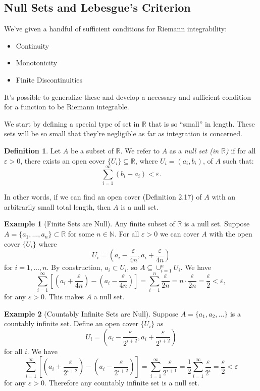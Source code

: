 \documentclass{article}
\newcommand{\N}{\mathbb{N}}
\newcommand{\R}{\mathbb{R}}
\theoremstyle{definition}
\newtheorem{definition}{Definition}[section]
\newtheorem{example}{Example}[section]
\begin{document}
\subsection{Null Sets and Lebesgue's Criterion}
We've given a handful of sufficient conditions for Riemann integrability:
\begin{itemize}
	\item Continuity
	\item Monotonicity 
	\item Finite Discontinuities 
\end{itemize}
It's possible to generalize these and develop a necessary and sufficient condition for a function to be Riemann integrable. 

We start by defining a special type of set in $ \R $ that is so ``small'' in length. These sets will be so small that they're negligible as far as integration is concerned. 
\begin{definition}
	Let $ A $ be a subset of $ \R $. We refer to $ A $ as a \textit{\color{red}null set (in $ \R $)} if for all $ \varepsilon > 0 $, there exists an open cover $ \{U_i\}\subseteq \R $, where $ U_i=(a_i,b_i) $, of $ A $ such that:
	$$\sum_{i=1}^\infty (b_i-a_i) < \varepsilon .$$
\end{definition}
In other words, if we can find an open cover (Definition 2.17) of $ A $ with an arbitrarily small total length, then $ A $ is a null set. 
\begin{example}[Finite Sets are Null]
Any finite subset of $ \R $ is a null set. Suppose $ A = \{a_1,\ldots,a_n\} \subset \R $ for some $ n\in \N $. For all $ \varepsilon>0 $ we can cover $ A $ with the open cover $ \{U_i\} $ where $$ U_i = \left(a_i-\frac{\varepsilon}{4n}, a_i+\frac{\varepsilon}{4n}\right) $$ for $ i=1,\ldots, n $. By construction, $ a_i \subset U_i $, so $ A \subseteq \cup_{i=1}^n U_i $. We have 
$$\sum_{i=1}^{\infty} \left[\left(a_i+\frac{\varepsilon}{4n}\right) - \left(a_i-\frac{\varepsilon}{4n}\right)\right] = \sum_{i=1}^{n}\frac{\varepsilon}{2n}=n\cdot \frac{\varepsilon}{2n}=\frac{\varepsilon}{2}<\varepsilon,$$ for any $ \varepsilon > 0 $. This makes $ A $ a null set. 
\end{example}
\begin{example}[Countably Infinite Sets are Null]
	Suppose $ A=\{a_1,a_2,\ldots\} $ is a countably infinite set. Define an open cover $ \{U_i\} $ as $$ U_i = \left(a_i-\frac{\varepsilon}{2^{i+2}}, a_i+\frac{\varepsilon}{2^{i+2}}\right)$$ for all $ i $.  
We have	$$\sum_{i=1}^{\infty} \left[\left(a_i+\frac{\varepsilon}{2^{i+2}}\right) - \left(a_i-\frac{\varepsilon}{2^{i+2}}\right)\right] = \sum_{i=1}^{\infty} \frac{\varepsilon}{2^{i+1}} = \frac{1}{2}\sum_{i=1}^{\infty} \frac{\varepsilon}{2^{i}}=\frac{\varepsilon}{2}< \varepsilon$$ for any $ \varepsilon >0 $. Therefore any countably infinite set is a null set.
\end{example}
\end{document}
